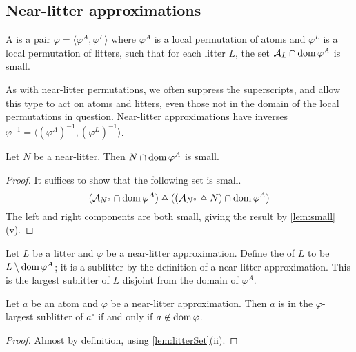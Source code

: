 \subsection{Near-litter approximations}

\begin{definition}
    A  is a pair \( \varphi = \langle \varphi^A, \varphi^L \rangle \) where \( \varphi^A \) is a local permutation of atoms and \( \varphi^L \) is a local permutation of litters, such that for each litter \( L \), the set \( \mathcal A_L \cap \operatorname{dom} \varphi^A \) is small.
\end{definition}
As with near-litter permutations, we often suppress the superscripts, and allow this type to act on atoms and litters, even those not in the domain of the local permutations in question.
Near-litter approximations have inverses \( \varphi^{-1} = \langle (\varphi^A)^{-1}, (\varphi^L)^{-1} \rangle \).
\begin{lemma}
    \label{lem:nearLitter_domain_small}
    Let \( N \) be a near-litter.
    Then \( N \cap \operatorname{dom} \varphi^A \) is small.
\end{lemma}
\begin{proof}
    It suffices to show that the following set is small.
    \[ (\mathcal A_{N^\circ} \cap \dom \varphi^A) \symmdiff ((\mathcal A_{N^\circ} \symmdiff N) \cap \dom \varphi^A) \]
    The left and right components are both small, giving the result by \cref{lem:small}(v).
\end{proof}
\begin{definition}
    Let \( L \) be a litter and \( \varphi \) be a near-litter approximation.
    Define the  of \( L \) to be \( L \setminus \operatorname{dom} \varphi^A \); it is a sublitter by the definition of a near-litter approximation.
    This is the largest sublitter of \( L \) disjoint from the domain of \( \varphi^A \).
\end{definition}
\begin{lemma}
    Let \( a \) be an atom and \( \varphi \) be a near-litter approximation.
    Then \( a \) is in the \( \varphi \)-largest sublitter of \( a^\circ \) if and only if \( a \not\in \operatorname{dom} \varphi \).
\end{lemma}
\begin{proof}
    Almost by definition, using \cref{lem:litterSet}(ii).
\end{proof}
